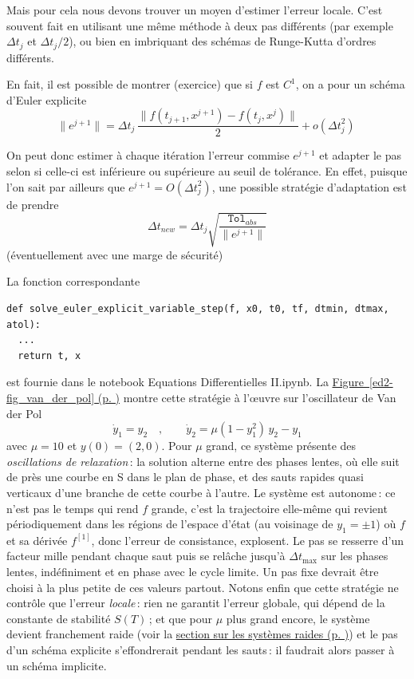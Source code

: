 Mais pour cela nous devons trouver un moyen d'estimer l'erreur locale.
C'est souvent fait en utilisant une même méthode à deux pas différents
(par exemple \({\Delta t}_j\) et \({\Delta t}_j/2\)), ou bien en
imbriquant des schémas de Runge-Kutta d'ordres différents.

En fait, il est possible de montrer (exercice) que si \(f\) est \(C^1\),
on a pour un schéma d'Euler explicite \[
\|e^{j+1}\| = {\Delta t}_j \, \frac{\big\|f(t_{j+1},x^{j+1}) - f(t_j,x^j)\big\|}{2} + o({\Delta t}_j^2) \ 
\]

On peut donc estimer à chaque itération l'erreur commise \(e^{j+1}\) et
adapter le pas selon si celle-ci est inférieure ou supérieure au seuil
de tolérance. En effet, puisque l'on sait par ailleurs que
\(e^{j+1} = O({\Delta t}_j^2)\), une possible stratégie d'adaptation est
de prendre\\
\[
{\Delta t}_{new} = {\Delta t}_j \sqrt{\frac{\texttt{Tol}_{abs}}{\|e^{j+1}\|}}
\] (éventuellement avec une marge de sécurité)

La fonction correspondante
\begin{verbatim}
def solve_euler_explicit_variable_step(f, x0, t0, tf, dtmin, dtmax, atol):
  ...
  return t, x
\end{verbatim}
est fournie dans le notebook Equations Differentielles II.ipynb.
La \protect\hyperlink{ed2-fig_van_der_pol}{Figure~\ref*{ed2-fig_van_der_pol}
(p. \pageref*{ed2-fig_van_der_pol})} montre cette stratégie à l'\oe uvre
sur l'oscillateur de Van der Pol \[
\dot{y}_1 = y_2 \quad , \qquad \dot{y}_2 = \mu (1-y_1^2)\, y_2 - y_1
\] avec \(\mu = 10\) et \(y(0) = (2,0)\). Pour \(\mu\) grand, ce système
présente des \emph{oscillations de relaxation}\,: la solution alterne
entre des phases lentes, où elle suit de près une courbe en S dans le
plan de phase, et des sauts rapides quasi verticaux d'une branche de
cette courbe à l'autre. Le système est autonome\,: ce n'est pas le temps
qui rend \(f\) grande, c'est la trajectoire elle-même qui revient
périodiquement dans les régions de l'espace d'état (au voisinage de
\(y_1=\pm 1\)) où \(f\) et sa dérivée \(f^{[1]}\), donc l'erreur de
consistance, explosent. Le pas se resserre d'un facteur mille pendant
chaque saut puis se relâche jusqu'à \({\Delta t}_{\max}\) sur les
phases lentes, indéfiniment et en phase avec le cycle limite. Un pas
fixe devrait être choisi à la plus petite de ces valeurs partout. Notons
enfin que cette stratégie ne contrôle que l'erreur \emph{locale}\,: rien
ne garantit l'erreur globale, qui dépend de la constante de stabilité
\(S(T)\)\,; et que pour \(\mu\) plus grand encore, le système devient
franchement raide (voir la
\protect\hyperlink{ed2-sec_systRaides}{section sur les systèmes raides
(p. \pageref*{ed2-sec_systRaides})}) et le pas d'un schéma explicite
s'effondrerait pendant les sauts\,: il faudrait alors passer à un schéma
implicite.

